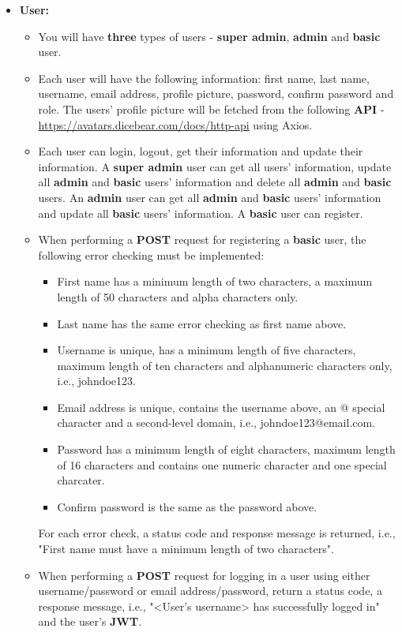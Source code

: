 \documentclass{article}
\begin{document}
\begin{itemize}
	\item \textbf{User:}
	\begin{itemize}
		\item You will have \textbf{three} types of users - \textbf{super admin}, \textbf{admin} and \textbf{basic} user.
		\item Each user will have the following information: first name, last name, username, email address, profile picture, password, confirm password and role. The users' profile picture will be fetched from the following \textbf{API} - \href{https://avatars.dicebear.com/docs/http-api}{https://avatars.dicebear.com/docs/http-api} using Axios. 
		\item Each user can login, logout, get their information and update their information. A \textbf{super admin} user can get all users' information, update all \textbf{admin} and \textbf{basic} users' information and delete all \textbf{admin} and \textbf{basic} users. An \textbf{admin} user can get all \textbf{admin} and \textbf{basic} users' information and update all \textbf{basic} users' information. A \textbf{basic} user can register.
		\item When performing a \textbf{POST} request for registering a \textbf{basic} user, the following error checking must be implemented:
		\begin{itemize}
			\item First name has a minimum length of two characters, a maximum length of 50 characters and alpha characters only.
			\item Last name has the same error checking as first name above.
			\item Username is unique, has a minimum length of five characters, maximum length of ten characters and alphanumeric characters only, i.e., johndoe123.
			\item Email address is unique, contains the username above, an @ special character and a second-level domain, i.e., johndoe123@email.com.
			\item Password has a minimum length of eight characters, maximum length of 16 characters and contains one numeric character and one special charcater.
			\item Confirm password is the same as the password above.
		\end{itemize}
		For each error check, a status code and response message is returned, i.e., "First name must have a minimum length of two characters".
		\item When performing a \textbf{POST} request for logging in a user using either username/password or email address/password, return a status code, a response message, i.e., "<User's username> has successfully logged in" and the user's \textbf{JWT}.

\end{itemize}
\end{itemize}
\end{document}
